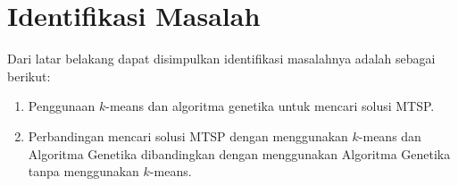 \section{Identifikasi Masalah}

Dari latar belakang dapat disimpulkan identifikasi masalahnya adalah sebagai berikut:
\begin{enumerate}
	\item Penggunaan $k$-means dan algoritma genetika untuk mencari solusi MTSP.
	\item Perbandingan mencari solusi MTSP dengan menggunakan $k$-means dan Algoritma Genetika dibandingkan dengan menggunakan Algoritma Genetika tanpa menggunakan $k$-means.
\end{enumerate}